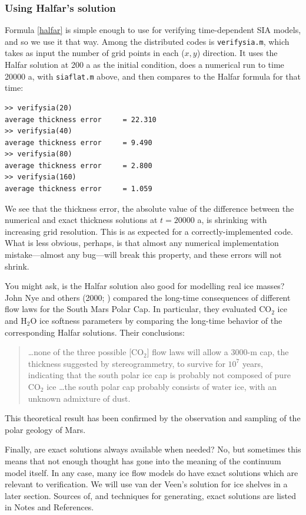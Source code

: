 \documentclass[titlepage,letterpaper,final,12pt]{scrartcl}
\begin{document}
\subsubsection*{Using Halfar's solution}  Formula \eqref{halfar} is simple enough to use for verifying time-dependent SIA models, and so we use it that way.  Among the distributed codes is \texttt{verifysia.m}, which takes as input the number of grid points in each ($x,y$) direction.  It uses the Halfar solution at 200 a as the initial condition, does a numerical run to time 20000 a, with \texttt{siaflat.m} above, and then compares to the Halfar formula for that time:
\small
\begin{verbatim}
>> verifysia(20)
average thickness error     = 22.310
>> verifysia(40)
average thickness error     = 9.490
>> verifysia(80)
average thickness error     = 2.800
>> verifysia(160)
average thickness error     = 1.059
\end{verbatim}
\normalsize
We see that the thickness error, the absolute value of the difference between the numerical and exact thickness solutions at $t=20000$ a, is shrinking with increasing grid resolution.  This is as expected for a correctly-implemented code.  What is less obvious, perhaps, is that almost any numerical implementation mistake---almost any bug---will break this property, and these errors will not shrink.

You might ask, is the Halfar solution also good for modelling real ice masses?  John Nye and others (2000; \cite{NyeIcarus2000}) compared the long-time consequences of different flow laws for the South Mars Polar Cap.  In particular, they evaluated $\text{CO}_2$ ice and $\text{H}_2\text{O}$ ice softness parameters by comparing the long-time behavior of the corresponding Halfar solutions.  Their conclusions:
  \begin{quote}
  \dots none of the three possible [$\text{CO}_2$] flow laws will allow a 3000-m cap, the thickness suggested by stereogrammetry, to survive for $10^7$ years, indicating that the south polar ice cap is probably not composed of pure $\text{CO}_2$ ice \dots the south polar cap probably consists of water ice, with an unknown admixture of dust.
  \end{quote}
This theoretical result has been confirmed by the observation and sampling of the polar geology of Mars.

Finally, are exact solutions always available when needed?  No, but sometimes this means that not enough thought has gone into the meaning of the continuum model itself.  In any case, many ice flow models do have exact solutions which are relevant to verification.  We will use van der Veen's solution for ice shelves in a later section.  Sources of, and techniques for generating, exact solutions are listed in Notes and References.
\end{document}
